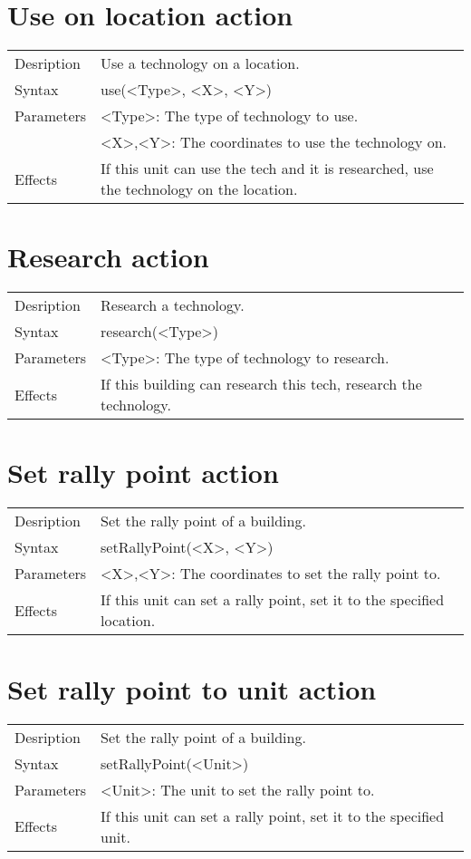 \documentclass[english,11pt]{report}
\begin{document}
\section{Use on location action}
\begin{tabularx}{\textwidth}{lX}
 Desription & Use a technology on a location. \\
 Syntax & use(<Type>, <X>, <Y>) \\
 Parameters & <Type>: The type of technology to use.\\
            & <X>,<Y>: The coordinates to use the technology on.\\
 Effects &  If this unit can use the tech and it is researched, use the technology on the location.
\end{tabularx}

\section{Research action}
\begin{tabularx}{\textwidth}{lX}
 Desription & Research a technology. \\
 Syntax & research(<Type>) \\
 Parameters & <Type>: The type of technology to research.\\
 Effects &  If this building can research this tech, research the technology.
\end{tabularx}

\section{Set rally point action}
\begin{tabularx}{\textwidth}{lX}
 Desription & Set the rally point of a building. \\
 Syntax & setRallyPoint(<X>, <Y>) \\
 Parameters & <X>,<Y>: The coordinates to set the rally point to.\\
 Effects &  If this unit can set a rally point, set it to the specified location.
\end{tabularx}

\section{Set rally point to unit action}
\begin{tabularx}{\textwidth}{lX}
 Desription & Set the rally point of a building. \\
 Syntax & setRallyPoint(<Unit>) \\
 Parameters & <Unit>: The unit to set the rally point to.\\
 Effects &  If this unit can set a rally point, set it to the specified unit.
\end{tabularx}
\end{document}
